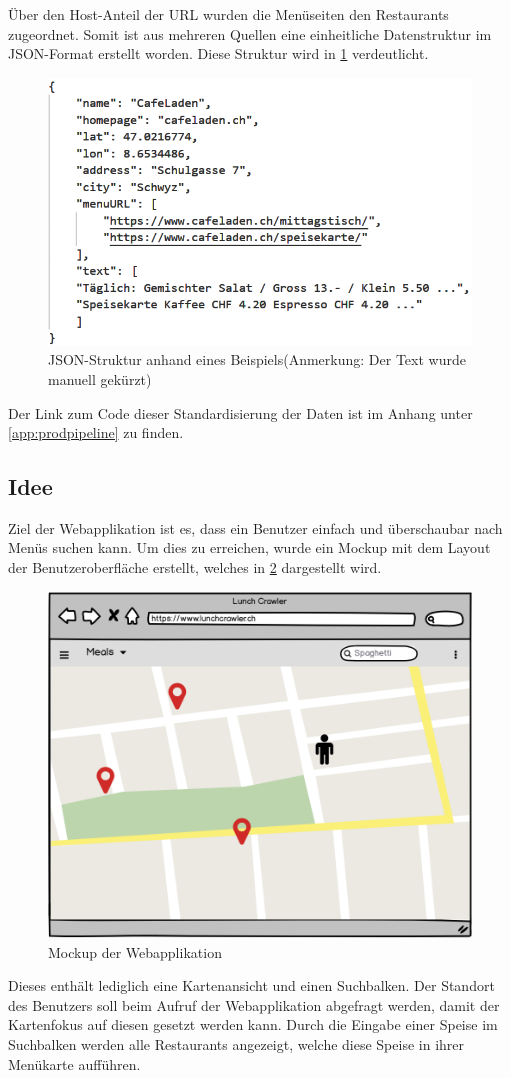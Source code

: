 Über den Host-Anteil der URL wurden die Menüseiten den Restaurants zugeordnet.
Somit ist aus mehreren Quellen eine einheitliche Datenstruktur im JSON-Format erstellt worden.
Diese Struktur wird in \cref{fig:json_struktur} verdeutlicht.
\begin{figure}[H]
	\centering
	\includegraphics[width=1\columnwidth,keepaspectratio]{img/json_struktur.png}
	\caption{JSON-Struktur anhand eines Beispiels(Anmerkung: Der Text wurde manuell gekürzt)}
	\label{fig:json_struktur}
\end{figure}
Der Link zum Code dieser Standardisierung der Daten ist im Anhang unter \cref{app:prodpipeline} zu finden.
\FloatBarrier
\subsection{Idee}
Ziel der Webapplikation ist es, dass ein Benutzer einfach und überschaubar nach Menüs suchen kann.
Um dies zu erreichen, wurde ein Mockup mit dem Layout der Benutzeroberfläche erstellt, welches in \cref{fig:webapp_mockup} dargestellt wird.
\begin{figure}[H]
	\centering
	\includegraphics[width=0.7\columnwidth,keepaspectratio]{img/webapp_mockup.png}
	\caption{Mockup der Webapplikation}
	\label{fig:webapp_mockup}
\end{figure}
Dieses enthält lediglich eine Kartenansicht und einen Suchbalken.
Der Standort des Benutzers soll beim Aufruf der Webapplikation abgefragt werden, damit der Kartenfokus auf diesen gesetzt werden kann.
Durch die Eingabe einer Speise im Suchbalken werden alle Restaurants angezeigt, welche diese Speise in ihrer Menükarte aufführen.
